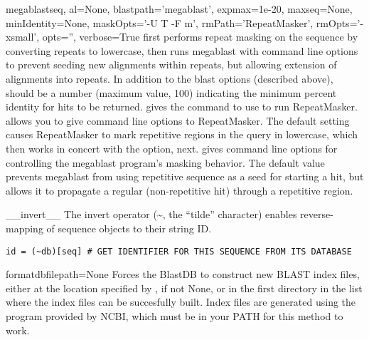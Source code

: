 \documentclass{howto}
\begin{document}
\begin{funcdesc}{megablast}{seq, al=None, blastpath='megablast', expmax=1e-20,
maxseq=None, minIdentity=None, maskOpts='-U T -F m',
rmPath='RepeatMasker', rmOpts='-xsmall', opts='', verbose=True}
  first performs repeat masking on the sequence by converting repeats to lowercase,
  then runs megablast with command line options to prevent seeding new alignments
  within repeats, but allowing extension of alignments into repeats.
  In addition to the blast options (described above),
   should be a number (maximum value, 100)
  indicating the minimum percent identity for hits to be returned.
   gives the command to use to run RepeatMasker.
   allows you to give command line options to RepeatMasker.
  The default setting causes RepeatMasker to mark repetitive regions in the
  query in lowercase, which then works in concert with the  option, next.
   gives command line options for controlling the megablast program's
  masking behavior.  The default value prevents megablast from using repetitive
  sequence as a seed for starting a hit, but allows it to propagate a regular
  (non-repetitive hit) through a repetitive region.
\end{funcdesc}

\begin{funcdesc}{__invert__}{}
  The invert operator (\textasciitilde, the ``tilde'' character) 
  enables reverse-mapping of sequence objects to their string ID.
\begin{verbatim}
id = (~db)[seq] # GET IDENTIFIER FOR THIS SEQUENCE FROM ITS DATABASE
\end{verbatim}
\end{funcdesc}

\begin{funcdesc}{formatdb}{filepath=None}
  Forces the BlastDB to construct new BLAST index files, either at the
  location specified by , if not None, or in the first
  directory in the  list where the index files
  can be succesfully built.  Index files are generated using the 
   program provided by NCBI, which must be in your
  PATH for this method to work.
\end{funcdesc}
\end{document}
